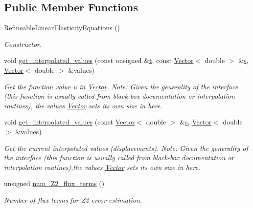 \subsection*{Public Member Functions}
\begin{DoxyCompactItemize}
\item 
\hyperlink{classoomph_1_1RefineableLinearElasticityEquations_a948ffa175a7a2299beb06150f69cb750}{Refineable\+Linear\+Elasticity\+Equations} ()
\begin{DoxyCompactList}\small\item\em Constructor. \end{DoxyCompactList}\item 
void \hyperlink{classoomph_1_1RefineableLinearElasticityEquations_ac048280ba30d323e92e42457f20163e4}{get\+\_\+interpolated\+\_\+values} (const unsigned \&\hyperlink{cfortran_8h_af6f0bd3dc13317f895c91323c25c2b8f}{t}, const \hyperlink{classoomph_1_1Vector}{Vector}$<$ double $>$ \&\hyperlink{cfortran_8h_ab7123126e4885ef647dd9c6e3807a21c}{s}, \hyperlink{classoomph_1_1Vector}{Vector}$<$ double $>$ \&values)
\begin{DoxyCompactList}\small\item\em Get the function value u in \hyperlink{classoomph_1_1Vector}{Vector}. Note\+: Given the generality of the interface (this function is usually called from black-\/box documentation or interpolation routines), the values \hyperlink{classoomph_1_1Vector}{Vector} sets its own size in here. \end{DoxyCompactList}\item 
void \hyperlink{classoomph_1_1RefineableLinearElasticityEquations_acd2c98989ca38e1534ac70d5b4dc37a5}{get\+\_\+interpolated\+\_\+values} (const \hyperlink{classoomph_1_1Vector}{Vector}$<$ double $>$ \&\hyperlink{cfortran_8h_ab7123126e4885ef647dd9c6e3807a21c}{s}, \hyperlink{classoomph_1_1Vector}{Vector}$<$ double $>$ \&values)
\begin{DoxyCompactList}\small\item\em Get the current interpolated values (displacements). Note\+: Given the generality of the interface (this function is usually called from black-\/box documentation or interpolation routines),the values \hyperlink{classoomph_1_1Vector}{Vector} sets its own size in here. \end{DoxyCompactList}\item 
unsigned \hyperlink{classoomph_1_1RefineableLinearElasticityEquations_a6f5a39ae1cdb8be2aeb6176cc093bfed}{num\+\_\+\+Z2\+\_\+flux\+\_\+terms} ()
\begin{DoxyCompactList}\small\item\em Number of \textquotesingle{}flux\textquotesingle{} terms for Z2 error estimation. \end{DoxyCompactList}\item 

\end{DoxyCompactItemize}
